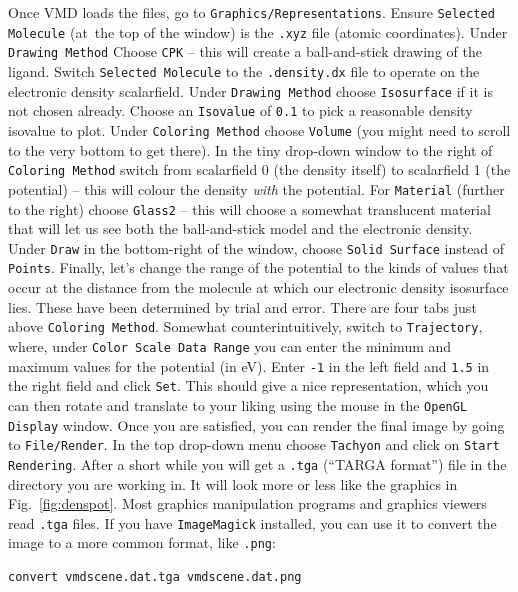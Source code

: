 \documentclass{article}
\newcommand{\vmd}[1]{\texttt{#1}}
\begin{document}
Once VMD loads the files, go to \vmd{Graphics/Representations}. Ensure \vmd{Selected Molecule} (at~the top of the window) is the \texttt{.xyz} file (atomic coordinates). Under \vmd{Drawing Method} Choose \vmd{CPK} -- this will create a ball-and-stick drawing of the ligand. Switch \vmd{Selected Molecule} to the \texttt{.density.dx} file to operate on the electronic density scalarfield. Under \vmd{Drawing Method} choose \vmd{Isosurface} if it is not chosen already. Choose an \vmd{Isovalue} of \vmd{0.1} to pick a reasonable density isovalue to plot. Under \vmd{Coloring Method} choose \vmd{Volume} (you might need to scroll to the very bottom to get there). In the tiny drop-down window to the right of \vmd{Coloring Method} switch from scalarfield 0 (the density itself) to scalarfield 1 (the potential) -- this will colour the density \textit{with} the potential. For \vmd{Material} (further to the right) choose \vmd{Glass2} -- this will choose a somewhat translucent material that will let us see both the ball-and-stick model and the electronic density. Under \vmd{Draw} in the bottom-right of the window, choose \vmd{Solid Surface} instead of \vmd{Points}. Finally, let's change the range of the potential to the kinds of values that occur at the distance from the molecule at which our electronic density isosurface lies. These have been determined by trial and error. There are four tabs just above \vmd{Coloring Method}. Somewhat counterintuitively, switch to \vmd{Trajectory}, where, under \vmd{Color Scale Data Range} you can enter the minimum and maximum values for the potential (in eV). Enter \vmd{-1} in the left field and \vmd{1.5} in the right field and click \vmd{Set}. This should give a nice representation, which you can then rotate and translate to your liking using the mouse in the \vmd{OpenGL Display} window. Once you are satisfied, you can render the final image by going to \vmd{File/Render}. In the top drop-down menu choose \vmd{Tachyon} and click on \vmd{Start Rendering}. After a short while you will get a \texttt{.tga} (``TARGA format'') file in the directory you are working in. It will look more or less like the graphics in Fig.~\ref{fig:denspot}. Most graphics manipulation programs and graphics viewers read \texttt{.tga} files. If you have \texttt{ImageMagick} installed, you can use it to convert the image to a more common format, like \texttt{.png}:

\begin{verbatim}
convert vmdscene.dat.tga vmdscene.dat.png    
\end{verbatim}
\end{document}
